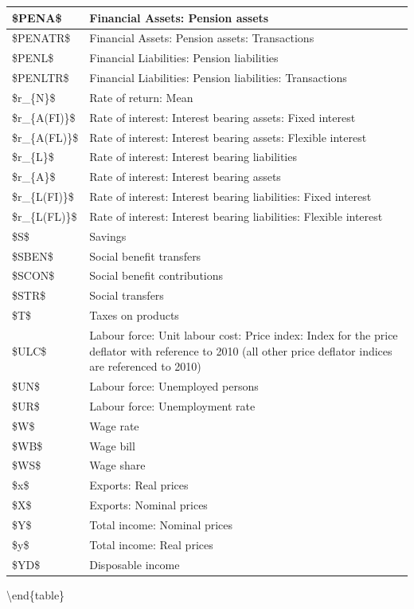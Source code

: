 \documentclass[
]{book}
\begin{document}
\begin{tabular}[t]{l|l}
\hline
\$PENA\$ & Financial Assets: Pension assets\\
\hline
\$PENATR\$ & Financial Assets: Pension assets: Transactions\\
\hline
\$PENL\$ & Financial Liabilities: Pension liabilities\\
\hline
\$PENLTR\$ & Financial Liabilities: Pension liabilities: Transactions\\
\hline
\$r\_\{N\}\$ & Rate of return: Mean\\
\hline
\$r\_\{A(FI)\}\$ & Rate of interest: Interest bearing assets: Fixed interest\\
\hline
\$r\_\{A(FL)\}\$ & Rate of interest: Interest bearing assets: Flexible interest\\
\hline
\$r\_\{L\}\$ & Rate of interest: Interest bearing liabilities\\
\hline
\$r\_\{A\}\$ & Rate of interest: Interest bearing assets\\
\hline
\$r\_\{L(FI)\}\$ & Rate of interest: Interest bearing liabilities: Fixed interest\\
\hline
\$r\_\{L(FL)\}\$ & Rate of interest: Interest bearing liabilities: Flexible interest\\
\hline
\$S\$ & Savings\\
\hline
\$SBEN\$ & Social benefit transfers\\
\hline
\$SCON\$ & Social benefit contributions\\
\hline
\$STR\$ & Social transfers\\
\hline
\$T\$ & Taxes on products\\
\hline
\$ULC\$ & Labour force: Unit labour cost: Price index: Index for the price deflator with reference to 2010 (all other price deflator indices are referenced to 2010)\\
\hline
\$UN\$ & Labour force: Unemployed persons\\
\hline
\$UR\$ & Labour force: Unemployment rate\\
\hline
\$W\$ & Wage rate\\
\hline
\$WB\$ & Wage bill\\
\hline
\$WS\$ & Wage share\\
\hline
\$x\$ & Exports: Real prices\\
\hline
\$X\$ & Exports: Nominal prices\\
\hline
\$Y\$ & Total income: Nominal prices\\
\hline
\$y\$ & Total income: Real prices\\
\hline
\$YD\$ & Disposable income\\
\hline
\end{tabular}

\textbackslash end\{table\}

  
\end{document}
